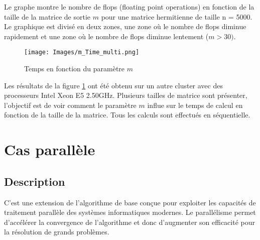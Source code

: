 \documentclass[11pt,french]{article}
\begin{document}
    Le graphe montre le nombre de flops (floating point operations) en fonction de la taille de la matrice de sortie $m$ pour une matrice hermitienne de taille n = 5000. Le graphique est divisé en deux zones, une zone où le nombre de flops diminue rapidement et une zone où le nombre de flops diminue lentement ($m>30)$. \\
    \FloatBarrier
        \begin{figure}[h]
    	\centering
    	\texttt{[image: Images/m\_Time\_multi.png]}
    	\caption{Temps en fonction du paramètre $m$}
    	\label{fig:multi}
    \end{figure}
    \par Les résultats de la figure \ref{fig:multi} ont été obtenu sur un autre cluster avec des processeurs Intel Xeon  E5 2.50GHz. Plusieurs tailles de matrice sont présenter, l'objectif est de voir comment le paramètre $m$ influe sur le temps de calcul en fonction de la taille de la  matrice. Tous les calculs sont effectués en séquentielle.
    
    
	\newpage

	\section{Cas parallèle}
	
	\subsection{Description}
    C'est une extension de l'algorithme de base conçue pour exploiter les capacités de traitement parallèle des systèmes informatiques modernes. Le parallélisme permet d'accélérer la convergence de l'algorithme et donc d'augmenter son efficacité pour la résolution de grands problèmes. \\
\end{document}
